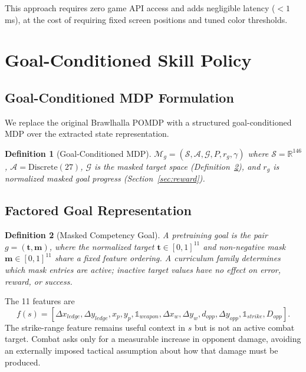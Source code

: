 \documentclass[11pt,a4paper]{article}
\newtheorem{definition}{Definition}
\begin{document}
This approach requires zero game API access and adds negligible latency ($< 1$ ms), at the cost of requiring fixed screen positions and tuned color thresholds.

\section{Goal-Conditioned Skill Policy}
\label{sec:llc}

\subsection{Goal-Conditioned MDP Formulation}

We replace the original Brawlhalla POMDP with a structured goal-conditioned MDP over the extracted state representation.

\begin{definition}[Goal-Conditioned MDP]
$\mathcal{M}_g = (\mathcal{S}, \mathcal{A}, \mathcal{G}, P, r_g, \gamma)$ where $\mathcal{S} = \mathbb{R}^{146}$, $\mathcal{A} = \text{Discrete}(27)$, $\mathcal{G}$ is the masked target space (Definition~\ref{def:masked-goal}), and $r_g$ is normalized masked goal progress (Section~\ref{sec:reward}).
\end{definition}

\subsection{Factored Goal Representation}
\label{sec:structured-goals}

\begin{definition}[Masked Competency Goal]
\label{def:masked-goal}
A pretraining goal is the pair $g=(\mathbf{t},\mathbf{m})$, where the normalized target
$\mathbf{t}\in[0,1]^{11}$ and non-negative mask $\mathbf{m}\in[0,1]^{11}$ share a
fixed feature ordering. A curriculum family determines which mask entries are active;
inactive target values have no effect on error, reward, or success.
\end{definition}

The 11 features are
\begin{equation}
f(s) = [\Delta x_{ledge},\Delta y_{ledge},x_p,y_p,
\mathbb{1}_{weapon},\Delta x_w,\Delta y_w,d_{opp},\Delta y_{opp},
\mathbb{1}_{strike},D_{opp}].
\label{eq:goal-features}
\end{equation}
The strike-range feature remains useful context in $s$ but is not an active combat
target. Combat asks only for a measurable increase in opponent damage, avoiding an
externally imposed tactical assumption about how that damage must be produced.
\end{document}

